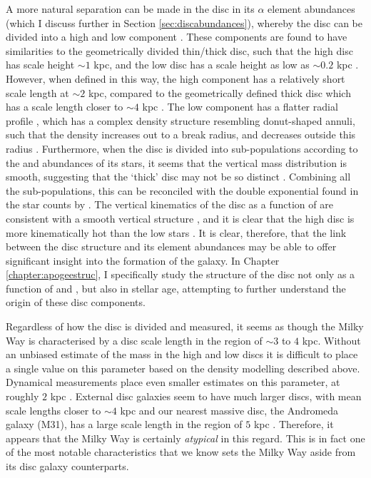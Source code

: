 A more natural separation can be made in the disc in its $\alpha$ element abundances (which I discuss further in Section \ref{sec:discabundances}), whereby the disc can be divided into a high and low \afe{} component \citep[e.g.][]{1998A&A...338..161F,2003A&A...410..527B,2005A&A...433..185B,2013A&A...560A.109H,2014A&A...562A..71B,2014A&A...564A.115A,2014ApJ...796...38N,2015ApJ...808..132H}. These components are found to have similarities to the geometrically divided thin/thick disc, such that the high \afe{} disc has scale height $\sim 1$ kpc, and the low \afe{} disc has a scale height as low as $\sim 0.2$ kpc \citep[e.g.][]{2012ApJ...753..148B,2016ApJ...823...30B}. However, when defined in this way, the high \afe{} component has a relatively short scale length at $\sim 2$ kpc, compared to the geometrically defined thick disc which has a scale length closer to $\sim4$ kpc \citep{2008ApJ...673..864J}. The low \afe{} component has a flatter radial profile \citep{2012ApJ...752...51C}, which has a complex density structure resembling donut-shaped annuli, such that the density increases out to a break radius, and decreases outside this radius \citep{2012ApJ...753..148B,2016ApJ...823...30B}. Furthermore, when the disc is divided into sub-populations according to the \afe{} and \feh{} abundances of its stars, it seems that the vertical mass distribution is smooth, suggesting that the `thick' disc may not be so distinct \citep{2012ApJ...751..131B}. Combining all the sub-populations, this can be reconciled with the double exponential found in the star counts by \citet{1983MNRAS.202.1025G} \citep[see][]{2013A&ARv..21...61R}. The vertical kinematics of the disc as a function of \afe{} are consistent with a smooth vertical structure \citep{2012ApJ...755..115B}, and it is clear that the high \afe{} disc is more kinematically hot than the low \afe{} stars \citep[e.g.][]{2005A&A...433..185B}. It is clear, therefore, that the link between the disc structure and its element abundances may be able to offer significant insight into the formation of the galaxy. In Chapter \ref{chapter:apogeestruc}, I specifically study the structure of the disc not only as a function of \afe{} and \feh{}, but also in stellar age, attempting to further understand the origin of these disc components.

Regardless of how the disc is divided and measured, it seems as though the Milky Way is characterised by a disc scale length in the region of $\sim 3$ to $4$ kpc. Without an unbiased estimate of the mass in the high and low \afe{} discs it is difficult to place a single value on this parameter based on the density modelling described above. Dynamical measurements place even smaller estimates on this parameter, at roughly $2$ kpc \citep{2013ApJ...779..115B}. External disc galaxies seem to have much larger discs, with mean scale lengths closer to $\sim 4$ kpc \citep[e.g.][]{2010MNRAS.406.1595F} and our nearest massive disc, the Andromeda galaxy (M31), has a large scale length in the region of $5$ kpc \citep[e.g.][]{2011ApJ...739...20C}. Therefore, it appears that the Milky Way is certainly \emph{atypical} in this regard. This is in fact one of the most notable characteristics that we know sets the Milky Way aside from its disc galaxy counterparts.


